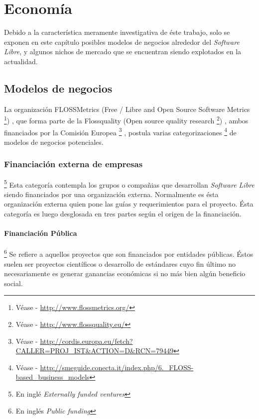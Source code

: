 \chapter{Econom\'ia}

Debido a la caracter\'istica meramente investigativa de \'este trabajo, solo
se exponen en este cap\'itulo posibles modelos de negocios alrededor del
\emph{Software Libre}, y algunos nichos de mercado que se encuentran siendo
explotados en la actualidad.\\

\section{Modelos de negocios}
La organizaci\'on FLOSSMetrics 
(Free / Libre and Open Source Software Metrics
\footnote{V\'ease - \url{http://www.flossmetrics.org/}})
, que forma parte de la Flossquality (Open source quality research
\footnote{V\'ease - \url{http://www.flossquality.eu/}})
, ambos financiados por la Comisi\'on Europea
\footnote{V\'ease -
\url{http://cordis.europa.eu/fetch?CALLER=PROJ_IST&ACTION=D&RCN=79449}}
, postula varias categorizaciones
\footnote{V\'ease -
\url{http://smeguide.conecta.it/index.php/6._FLOSS-based_business_models}} 
de modelos de negocios potenciales.


\subsection{Financiaci\'on externa de empresas}\footnote{En ingl\'e
\emph{Externally funded ventures}}
%
Esta categor\'ia contempla los grupos o compa\~nias que desarrollan
\emph{Software Libre} siendo financiados por una organizaci\'on externa.
Normalmente es \'esta organizaci\'on externa quien pone las gu\'ias y
requerimientos para el proyecto. \'Esta categor\'ia es luego desglosada en tres
partes seg\'un el origen de la financiaci\'on.

\subsubsection{Financiaci\'on P\'ublica}\footnote{En ingl\'es \emph{Public
funding}}
%
Se refiere a aquellos proyectos que son financiados por entidades p\'ublicas.
\'Estos suelen ser proyectos cient\'ificos o desarrollo de est\'andares cuyo
fin
\'ultimo no necesariamente es generar ganancias econ\'omicas si no m\'as bien
alg\'un beneficio social.

